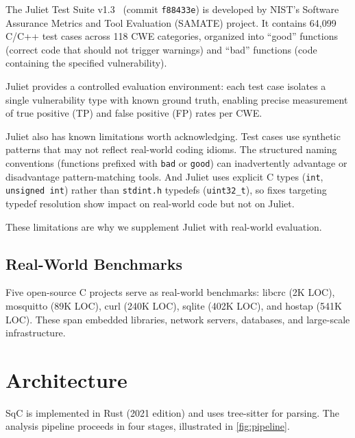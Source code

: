 \documentclass[10pt,twocolumn,letterpaper]{article}
\begin{document}
The Juliet Test Suite v1.3~\cite{juliet} (commit \texttt{f88433e})
is developed by NIST's
Software Assurance Metrics and Tool Evaluation (SAMATE) project.
It contains 64,099 C/C++ test cases across 118 CWE categories,
organized into ``good'' functions (correct code that should not
trigger warnings) and ``bad'' functions (code containing the
specified vulnerability).

Juliet provides a controlled evaluation environment: each test case
isolates a single vulnerability type with known ground truth, enabling
precise measurement of true positive (TP) and false positive (FP) rates
per CWE.

Juliet also has known limitations worth acknowledging.  Test cases use
synthetic patterns that may not reflect real-world coding idioms.  The
structured naming conventions (functions prefixed with \texttt{bad} or
\texttt{good}) can inadvertently advantage or disadvantage
pattern-matching tools.  And Juliet uses explicit C types
(\texttt{int}, \texttt{unsigned int}) rather than \texttt{stdint.h}
typedefs (\texttt{uint32\_t}), so fixes targeting typedef resolution
show impact on real-world code but not on Juliet.

These limitations are why we supplement Juliet with real-world
evaluation.

\subsection{Real-World Benchmarks}

Five open-source C projects serve as real-world benchmarks:
libcrc (2K LOC), mosquitto (89K LOC), curl (240K LOC),
sqlite (402K LOC), and hostap (541K LOC).  These span embedded
libraries, network servers, databases, and large-scale infrastructure.

\section{Architecture}
\label{sec:architecture}

SqC is implemented in Rust (2021 edition) and uses tree-sitter for
parsing.  The analysis pipeline proceeds in four stages, illustrated
in \cref{fig:pipeline}.
\end{document}
